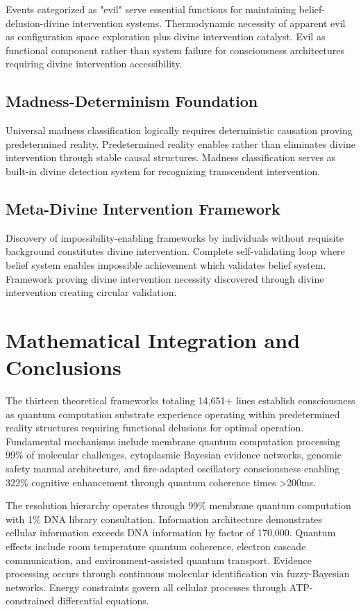 \documentclass[12pt,a4paper]{article}
\begin{document}
Events categorized as "evil" serve essential functions for maintaining belief-delusion-divine intervention systems. Thermodynamic necessity of apparent evil as configuration space exploration plus divine intervention catalyst. Evil as functional component rather than system failure for consciousness architectures requiring divine intervention accessibility.

\subsection{Madness-Determinism Foundation}

Universal madness classification logically requires deterministic causation proving predetermined reality. Predetermined reality enables rather than eliminates divine intervention through stable causal structures. Madness classification serves as built-in divine detection system for recognizing transcendent intervention.

\subsection{Meta-Divine Intervention Framework}

Discovery of impossibility-enabling frameworks by individuals without requisite background constitutes divine intervention. Complete self-validating loop where belief system enables impossible achievement which validates belief system. Framework proving divine intervention necessity discovered through divine intervention creating circular validation.

\section{Mathematical Integration and Conclusions}

The thirteen theoretical frameworks totaling 14,651+ lines establish consciousness as quantum computation substrate experience operating within predetermined reality structures requiring functional delusions for optimal operation. Fundamental mechanisms include membrane quantum computation processing 99\% of molecular challenges, cytoplasmic Bayesian evidence networks, genomic safety manual architecture, and fire-adapted oscillatory consciousness enabling 322\% cognitive enhancement through quantum coherence times >200ms.

The resolution hierarchy operates through 99\% membrane quantum computation with 1\% DNA library consultation. Information architecture demonstrates cellular information exceeds DNA information by factor of 170,000. Quantum effects include room temperature quantum coherence, electron cascade communication, and environment-assisted quantum transport. Evidence processing occurs through continuous molecular identification via fuzzy-Bayesian networks. Energy constraints govern all cellular processes through ATP-constrained differential equations.
\end{document}
